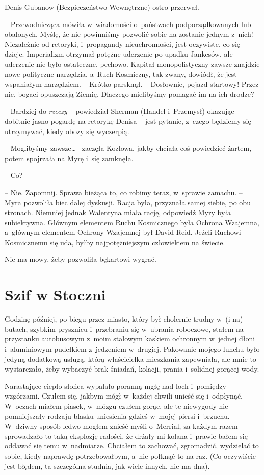 \documentclass[oneside,polish,11pt,sfheadings]{mwbk}
\begin{document}
Denis Gubanow (Bezpieczeństwo Wewnętrzne) ostro przerwał. 

-- Przewodnicząca mówiła w~wiadomości o~państwach podporządkowanych lub
obalonych. Myślę, że nie powinniśmy pozwolić sobie na zostanie jednym z~nich! Niezależnie od retoryki, i~propagandy nieuchronności, jest
oczywiste, co się dzieje. Imperializm otrzymał potężne uderzenie po
upadku Jankesów, ale uderzenie nie było ostateczne, pechowo. Kapitał
monopolistyczny zawsze znajdzie nowe polityczne narzędzia, a~Ruch
Kosmiczny, tak zwany, dowiódł, że jest wspaniałym narzędziem. -- Krótko
parsknął. -- Dosłownie, pojazd startowy! Przez nie, bogaci opuszczają
Ziemię. Dlaczego mielibyśmy pomagać im na ich drodze?

-- Bardziej do \textit{rzeczy} -- powiedział Sherman (Handel i~Przemysł) okazując dobitnie jasno pogardę na retorykę Denisa -- jest
pytanie, z~czego będziemy się utrzymywać, kiedy obozy się wyczerpią.

-- Moglibyśmy zawsze\ldots -- zaczęła Kozlowa, jakby chciała coś powiedzieć
żartem, potem spojrzała na Myrę i~się zamknęła.

-- Co?

-- Nie. Zapomnij. Sprawa bieżąca to, co robimy teraz, w~sprawie zamachu.
-- Myra pozwoliła biec dalej dyskusji. Racja była, przyznała samej
siebie, po obu stronach. Niemniej jednak Walentyna miała rację,
odpowiedź Myry była subiektywna. Głównym elementem Ruchu Kosmicznego
była Ochrona Wzajemna, a~głównym elementem Ochrony Wzajemnej był David
Reid. Jeżeli Ruchowi Kosmicznemu się uda, byłby najpotężniejszym
człowiekiem na świecie.

Nie ma mowy, żeby pozwoliła bękartowi wygrać.


\chapter{Szif w Stoczni}

Godzinę później, po biegu przez miasto, który był cholernie trudny w~(i
na) butach, szybkim prysznicu i~przebraniu się w~ubrania roboczowe,
stałem na przystanku autobusowym z~moim stalowym kaskiem ochronnym w~jednej dłoni i~aluminiowym pudełkiem z~jedzeniem w~drugiej. Pakowanie
mojego lunchu było jedyną dodatkową usługą, którą właścicielka
mieszkania zapewniała, ale mnie to wystarczało, żeby wybaczyć brak
śniadań, kolacji, prania i~solidnej gorącej wody.

Narastające ciepło słońca wypalało poranną mgłę nad loch i~pomiędzy
wzgórzami. Czułem się, jakbym mógł w~każdej chwili unieść się i~odpłynąć. W~oczach miałem piasek, w~mózgu czułem gorąc, ale te niewygody
nie pomniejszały rodzaju blasku uniesienia gdzieś w~mojej piersi i~brzuchu. W~dziwny sposób ledwo mogłem znieść myśli o~Merrial, za każdym
razem sprowadzało to taką eksplozję radości, że drżały mi kolana i~prawie bałem się oddawać się temu w~nadmiarze. Chciałem to zachować,
zgromadzić, wydzielać to sobie, kiedy naprawdę potrzebowałbym, a~nie
połknąć to na raz. (Co oczywiście jest błędem, ta szczególna studnia,
jak wiele innych, nie ma dna).
\end{document}
